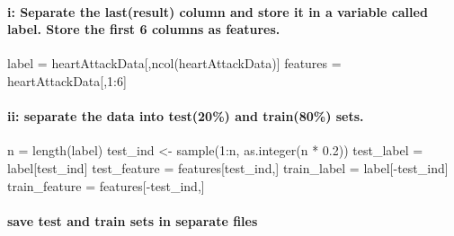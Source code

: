 \documentclass[
]{article}
\newenvironment{Shaded}{\begin{snugshade}}{\end{snugshade}}
\newcommand{\DecValTok}[1]{\textcolor[rgb]{0.00,0.00,0.81}{#1}}
\newcommand{\FloatTok}[1]{\textcolor[rgb]{0.00,0.00,0.81}{#1}}
\newcommand{\FunctionTok}[1]{\textcolor[rgb]{0.00,0.00,0.00}{#1}}
\newcommand{\NormalTok}[1]{#1}
\newcommand{\OtherTok}[1]{\textcolor[rgb]{0.56,0.35,0.01}{#1}}
\newcommand{\SpecialCharTok}[1]{\textcolor[rgb]{0.00,0.00,0.00}{#1}}
\begin{document}
\hypertarget{i-separate-the-lastresult-column-and-store-it-in-a-variable-called-label.-store-the-first-6-columns-as-features.}{%
\paragraph{i: Separate the last(result) column and store it in a
variable called label. Store the first 6 columns as
features.}\label{i-separate-the-lastresult-column-and-store-it-in-a-variable-called-label.-store-the-first-6-columns-as-features.}}

\begin{Shaded}
\begin{Highlighting}[]
\NormalTok{label }\OtherTok{=}\NormalTok{ heartAttackData[,}\FunctionTok{ncol}\NormalTok{(heartAttackData)]}
\NormalTok{features }\OtherTok{=}\NormalTok{ heartAttackData[,}\DecValTok{1}\SpecialCharTok{:}\DecValTok{6}\NormalTok{]}
\end{Highlighting}
\end{Shaded}

\hypertarget{ii-separate-the-data-into-test20-and-train80-sets.}{%
\paragraph{ii: separate the data into test(20\%) and train(80\%)
sets.}\label{ii-separate-the-data-into-test20-and-train80-sets.}}

\begin{Shaded}
\begin{Highlighting}[]
\NormalTok{n }\OtherTok{=} \FunctionTok{length}\NormalTok{(label)}
\NormalTok{test\_ind }\OtherTok{\textless{}{-}} \FunctionTok{sample}\NormalTok{(}\DecValTok{1}\SpecialCharTok{:}\NormalTok{n, }\FunctionTok{as.integer}\NormalTok{(n }\SpecialCharTok{*} \FloatTok{0.2}\NormalTok{))}
\NormalTok{test\_label }\OtherTok{=}\NormalTok{ label[test\_ind]}
\NormalTok{test\_feature }\OtherTok{=}\NormalTok{ features[test\_ind,]}
\NormalTok{train\_label }\OtherTok{=}\NormalTok{ label[}\SpecialCharTok{{-}}\NormalTok{test\_ind]}
\NormalTok{train\_feature }\OtherTok{=}\NormalTok{ features[}\SpecialCharTok{{-}}\NormalTok{test\_ind,]}
\end{Highlighting}
\end{Shaded}

\hypertarget{save-test-and-train-sets-in-separate-files}{%
\paragraph{save test and train sets in separate
files}\label{save-test-and-train-sets-in-separate-files}}
\end{document}
